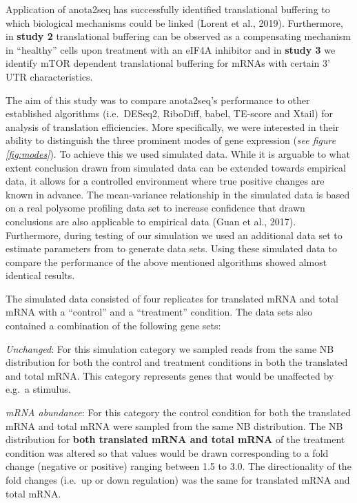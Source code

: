 \documentclass[
  12pt,
  openany]{book}
\begin{document}
Application of anota2seq has successfully identified translational buffering to which biological mechanisms could be linked (Lorent et al., 2019). Furthermore, in \textbf{study 2} translational buffering can be observed as a compensating mechanism in ``healthy'' cells upon treatment with an eIF4A inhibitor and in \textbf{study 3} we identify mTOR dependent translational buffering for mRNAs with certain 3' UTR characteristics.

The aim of this study was to compare anota2seq's performance to other established algorithms (i.e.~DESeq2, RiboDiff, babel, TE-score and Xtail) for analysis of translation efficiencies. More specifically, we were interested in their ability to distinguish the three prominent modes of gene expression (\emph{see figure \ref{fig:modes}}). To achieve this we used simulated data. While it is arguable to what extent conclusion drawn from simulated data can be extended towards empirical data, it allows for a controlled environment where true positive changes are known in advance. The mean-variance relationship in the simulated data is based on a real polysome profiling data set to increase confidence that drawn conclusions are also applicable to empirical data (Guan et al., 2017). Furthermore, during testing of our simulation we used an additional data set to estimate parameters from to generate data sets. Using these simulated data to compare the performance of the above mentioned algorithms showed almost identical results.

The simulated data consisted of four replicates for translated mRNA and total mRNA with a ``control'' and a ``treatment'' condition. The data sets also contained a combination of the following gene sets:

\emph{Unchanged}: For this simulation category we sampled reads from the same NB distribution for both the control and treatment conditions in both the translated and total mRNA. This category represents genes that would be unaffected by e.g.~a stimulus.

\emph{mRNA abundance}: For this category the control condition for both the translated mRNA and total mRNA were sampled from the same NB distribution. The NB distribution for \textbf{both translated mRNA and total mRNA} of the treatment condition was altered so that values would be drawn corresponding to a fold change (negative or positive) ranging between 1.5 to 3.0. The directionality of the fold changes (i.e.~up or down regulation) was the same for translated mRNA and total mRNA.
\end{document}

